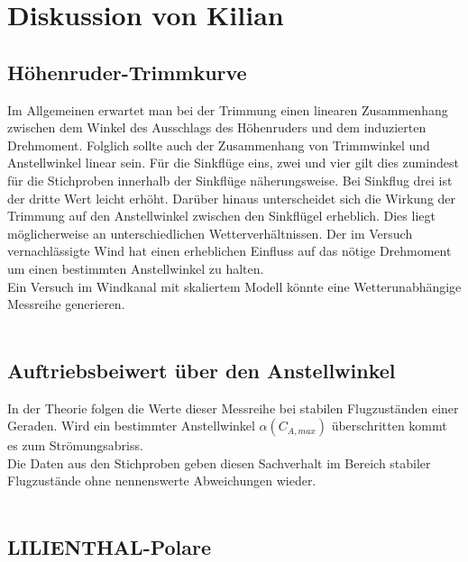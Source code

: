 \vspace{10mm}

\section{Diskussion von Kilian}
\subsection{Höhenruder-Trimmkurve}

Im Allgemeinen erwartet man bei der Trimmung einen linearen Zusammenhang zwischen dem Winkel des Ausschlags des Höhenruders und dem induzierten Drehmoment. Folglich sollte auch der Zusammenhang von Trimmwinkel und Anstellwinkel linear sein. Für die Sinkflüge eins, zwei und vier gilt dies zumindest für die Stichproben innerhalb der Sinkflüge näherungsweise. Bei Sinkflug drei ist der dritte Wert leicht erhöht. Darüber hinaus unterscheidet sich die Wirkung der Trimmung auf den Anstellwinkel zwischen den Sinkflügel erheblich. Dies liegt möglicherweise an unterschiedlichen Wetterverhältnissen. Der im Versuch vernachlässigte Wind hat einen erheblichen Einfluss auf das nötige Drehmoment um einen bestimmten Anstellwinkel zu halten.\\
Ein Versuch im Windkanal mit skaliertem Modell könnte eine Wetterunabhängige Messreihe generieren.\\\\

\subsection{Auftriebsbeiwert über den Anstellwinkel}

In der Theorie folgen die Werte dieser Messreihe bei stabilen Flugzuständen einer Geraden. Wird ein bestimmter Anstellwinkel $\alpha({C_{A,max}})$ überschritten kommt es zum Strömungsabriss.\\
Die Daten aus den Stichproben geben diesen Sachverhalt im Bereich stabiler Flugzustände ohne nennenswerte Abweichungen wieder.\\\\

\subsection{LILIENTHAL-Polare}

